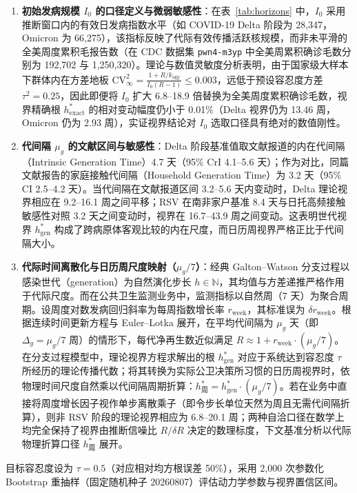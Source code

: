 \documentclass[11pt,a4paper]{article}
\theoremstyle{plain}
\theoremstyle{definition}
\begin{document}
\begin{enumerate}
\item \textbf{初始发病规模 $I_0$ 的口径定义与微弱敏感性}：在表~\ref{tab:horizons} 中，$I_0$ 采用推断窗口内的有效日发病指数水平（如 COVID-19 Delta 阶段为 28,347，Omicron 为 66,275），该指标反映了代际有效传播活跃核规模，而非未平滑的全美周度累积毛报告数（在 CDC 数据集 \texttt{pwn4-m3yp} 中全美周累积确诊毛数分别为 192,702 与 1,250,320）。理论与数值灵敏度分析表明，由于国家级大样本下群体内在方差地板 $\text{CV}_\infty^2 = \frac{1+R/k_{\text{agg}}}{I_0(R-1)} \le 0.003$，远低于预设容忍度方差 $\tau^2 = 0.25$，因此即便将 $I_0$ 扩大 6.8--18.9 倍替换为全美周度累积确诊毛数，视界精确根 $h^*_{\text{exact}}$ 的相对变动幅度仍小于 0.01\%（Delta 视界仍为 13.46 周，Omicron 仍为 2.93 周），实证视界结论对 $I_0$ 选取口径具有绝对的数值刚性。
\item \textbf{代间隔 $\mu_g$ 的文献区间与敏感性}：Delta 阶段基准值取文献报道的内在代间隔（Intrinsic Generation Time）4.7 天（95\% CrI 4.1--5.6 天）\citep{hart2022generation}；作为对比，同篇文献报告的家庭接触代间隔（Household Generation Time）为 3.2 天（95\% CI 2.5--4.2 天）。当代间隔在文献报道区间 3.2--5.6 天内变动时，Delta 理论视界相应在 9.2--16.1 周之间平移；RSV 在南非家户基准 8.4 天\citep{cohen2024respiratory}与日托高频接触敏感性对照 3.2 天之间变动时，视界在 16.7--43.9 周之间变动。这表明世代视界 $h^*_{\text{gen}}$ 构成了跨病原体客观比较的内在尺度，而日历周视界严格正比于代间隔大小。
\item \textbf{代际时间离散化与日历周尺度映射（$\mu_g / 7$）}：经典 Galton--Watson 分支过程以感染世代（generation）为自然演化步长 $h \in \mathbb{N}$，其均值与方差递推严格作用于代际尺度。而在公共卫生监测业务中，监测指标以自然周（7 天）为聚合周期。设周度对数发病回归斜率为每周指数增长率 $r_{\text{week}}$，其标准误为 $\delta r_{\text{week}}$。根据连续时间更新方程与 Euler--Lotka 展开，在平均代间隔为 $\mu_g$ 天（即 $\Delta_g = \mu_g / 7$ 周）的情形下，每代净再生数近似满足 $R \approx 1 + r_{\text{week}} \cdot (\mu_g / 7)$。在分支过程模型中，理论视界方程求解出的根 $h^*_{\text{gen}}$ 对应于系统达到容忍度 $\tau$ 所经历的理论传播代数；将其转换为实际公卫决策所习惯的日历周视界时，依物理时间尺度自然乘以代间隔周期折算：$h^*_{\text{周}} = h^*_{\text{gen}} \cdot (\mu_g / 7)$。若在业务中直接将周度增长因子视作单步离散乘子（即令步长单位天然为周且无需代间隔折算），则非 RSV 阶段的理论视界相应为 6.8--20.1 周；两种自洽口径在数学上均完全保持了视界由推断信噪比 $R/\delta R$ 决定的数理标度，下文基准分析以代际物理折算口径 $h^*_{\text{周}}$ 展开。
\end{enumerate}
目标容忍度设为 $\tau = 0.5$（对应相对均方根误差 50\%），采用 2,000 次参数化 Bootstrap 重抽样（固定随机种子 20260807）评估动力学参数与视界置信区间。
\end{document}
